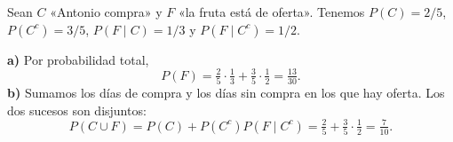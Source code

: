 Sean $C$ «Antonio compra» y $F$ «la fruta está de oferta». Tenemos $P(C)=2/5$, $P(C^c)=3/5$, $P(F\mid C)=1/3$ y $P(F\mid C^c)=1/2$.

\textbf{a)} Por probabilidad total,
\[
P(F)=\tfrac25\cdot\tfrac13+\tfrac35\cdot\tfrac12=\boxed{\tfrac{13}{30}}.
\]
\textbf{b)} Sumamos los días de compra y los días sin compra en los que hay oferta. Los dos sucesos son disjuntos:
\[
P(C\cup F)=P(C)+P(C^c)P(F\mid C^c)=\tfrac25+\tfrac35\cdot\tfrac12=\boxed{\tfrac7{10}}.
\]
